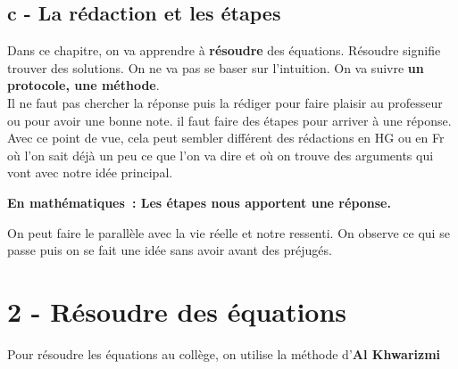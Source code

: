 \documentclass[11pt]{article}
\begin{document}
\subsection*{c - La rédaction et les étapes}

Dans ce chapitre, on va apprendre à \textbf{résoudre} des équations. Résoudre signifie trouver des solutions. On ne va pas se baser sur l’intuition. On va suivre \textbf{un protocole, une méthode}.\\

Il ne faut pas chercher la réponse puis la rédiger pour faire plaisir au professeur ou pour avoir une bonne note. il faut faire des étapes pour arriver à une réponse. Avec ce point de vue, cela peut sembler différent des rédactions en HG ou en Fr où l’on sait déjà un peu ce que l’on va dire et où on trouve des arguments qui vont avec notre idée principal. \\

\begin{center}\textbf{En mathématiques : Les étapes nous apportent une réponse.}\end{center}

On peut faire le parallèle avec la vie réelle et notre ressenti. On observe ce qui se passe puis on se fait une idée sans avoir avant des préjugés. 

\newpage
\section*{2 - Résoudre des équations}

Pour résoudre les équations au collège, on utilise la méthode d’\textbf{Al Khwarizmi}
\end{document}
